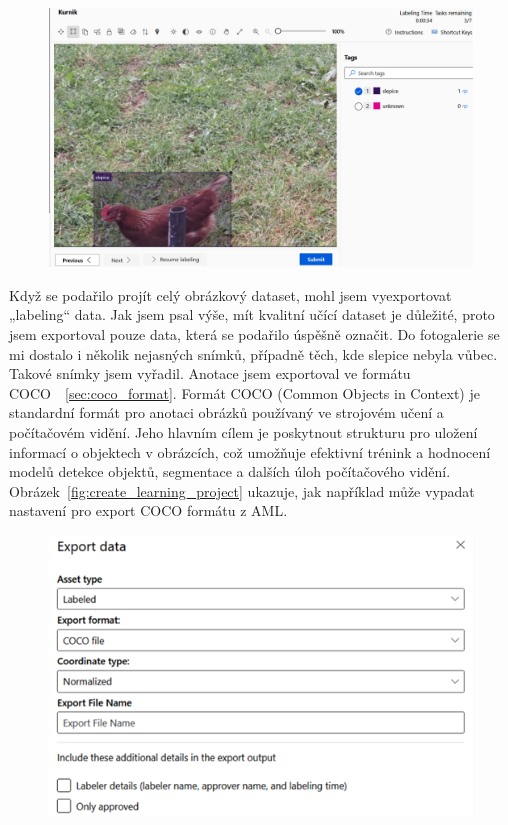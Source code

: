 \begin{figure}[H]
    \centering
    \includegraphics[width=1.0\textwidth]{img/chicken_labeling}
    \label{fig:chicken_labeling}
\end{figure}

Když se podařilo projít celý obrázkový dataset, mohl jsem vyexportovat „labeling“ data.
Jak jsem psal výše, mít kvalitní učící dataset je důležité, proto jsem exportoval pouze data, která se podařilo úspěšně označit.
Do fotogalerie se mi dostalo i několik nejasných snímků, případně těch, kde slepice nebyla vůbec.
Takové snímky jsem vyřadil.
Anotace jsem exportoval ve formátu COCO~\cite{COCOFormat}~\ref{sec:coco_format}.
Formát COCO (Common Objects in Context) je standardní formát pro anotaci obrázků používaný ve strojovém učení a počítačovém vidění.
Jeho hlavním cílem je poskytnout strukturu pro uložení informací o objektech v obrázcích, což umožňuje efektivní trénink a hodnocení modelů detekce objektů, segmentace a dalších úloh počítačového vidění.
Obrázek~\ref{fig:create_learning_project} ukazuje, jak například může vypadat nastavení pro export COCO formátu z AML.

\begin{figure}[H]
    \centering
    \includegraphics[width=1.0\textwidth]{img/export_coco_format}
    \label{fig:export_coco_format}
\end{figure}

